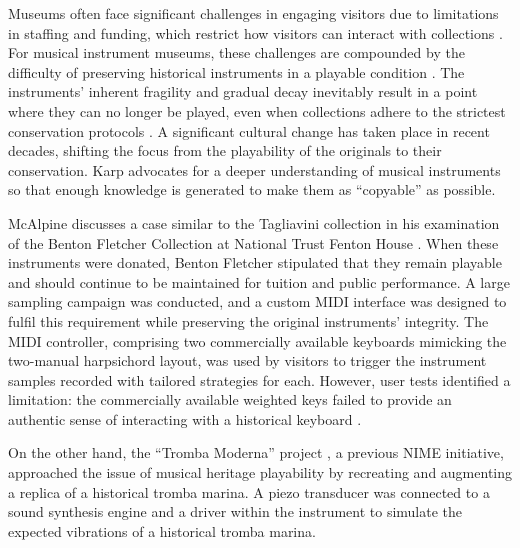 Museums often face significant challenges in engaging visitors due to limitations in staffing and funding, which restrict how visitors can interact with collections \cite{Templeton2018, McAlpine2014}. For musical instrument museums, these challenges are compounded by the difficulty of preserving historical instruments in a playable condition \cite{McAlpine2014}. The instruments' inherent fragility and gradual decay inevitably result in a point where they can no longer be played, even when collections adhere to the strictest conservation protocols \cite{NYT_strad}. A significant cultural change has taken place in recent decades, shifting the focus from the playability of the originals to their conservation. Karp \cite{Karp1979,Karp1985} advocates for a deeper understanding of musical instruments so that enough knowledge is generated to make them as ``copyable'' as possible.

McAlpine discusses a case similar to the Tagliavini collection in his examination of the Benton Fletcher Collection at National Trust Fenton House \cite{McAlpine2014}. When these instruments were donated, Benton Fletcher stipulated that they remain playable and should continue to be maintained for tuition and public performance. A large sampling campaign was conducted, and a custom MIDI interface was designed to fulfil this requirement while preserving the original instruments' integrity. The MIDI controller, comprising two commercially available keyboards mimicking the two-manual harpsichord layout, was used by visitors to trigger the instrument samples recorded with tailored strategies for each. However, user tests identified a limitation: the commercially available weighted keys failed to provide an authentic sense of interacting with a historical keyboard \cite{McAlpine2014}. 

On the other hand, the ``Tromba Moderna'' project \cite{Baldwin2016}, a previous NIME initiative, approached the issue of musical heritage playability by recreating and augmenting a replica of a historical tromba marina. A piezo transducer was connected to a sound synthesis engine and a driver within the instrument to simulate the expected vibrations of a historical tromba marina. 

